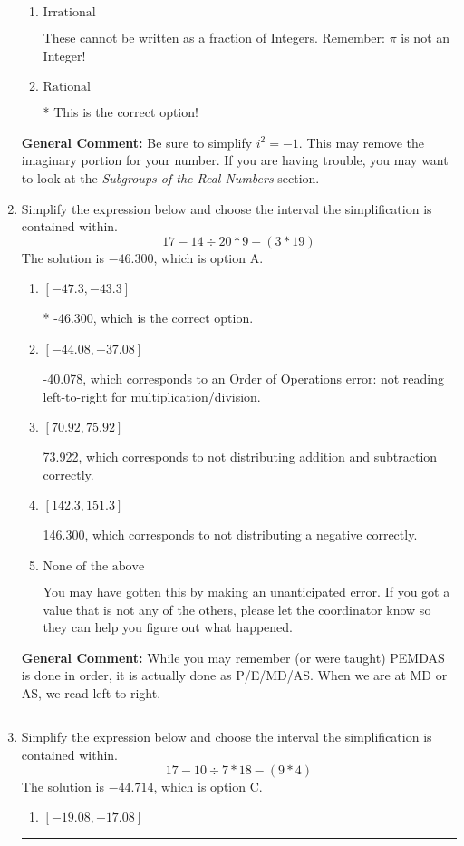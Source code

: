 \documentclass{extbook}[14pt]
\newcommand{\litem}[1]{\item #1

\rule{\textwidth}{0.4pt}}
\begin{document}
\begin{enumerate}
{\begin{enumerate}[label=\Alph*.]
This is a Complex number $(a+bi)$ that is not Real (has $i$ as part of the number).
\item \( \text{Irrational} \)

These cannot be written as a fraction of Integers. Remember: $\pi$ is not an Integer!
\item \( \text{Rational} \)

* This is the correct option!
\end{enumerate}

\textbf{General Comment:} Be sure to simplify $i^2 = -1$. This may remove the imaginary portion for your number. If you are having trouble, you may want to look at the \textit{Subgroups of the Real Numbers} section.
}
\litem{
Simplify the expression below and choose the interval the simplification is contained within.
\[ 17 - 14 \div 20 * 9 - (3 * 19) \]The solution is \( -46.300 \), which is option A.\begin{enumerate}[label=\Alph*.]
\item \( [-47.3, -43.3] \)

* -46.300, which is the correct option.
\item \( [-44.08, -37.08] \)

 -40.078, which corresponds to an Order of Operations error: not reading left-to-right for multiplication/division.
\item \( [70.92, 75.92] \)

 73.922, which corresponds to not distributing addition and subtraction correctly.
\item \( [142.3, 151.3] \)

 146.300, which corresponds to not distributing a negative correctly.
\item \( \text{None of the above} \)

 You may have gotten this by making an unanticipated error. If you got a value that is not any of the others, please let the coordinator know so they can help you figure out what happened.
\end{enumerate}

\textbf{General Comment:} While you may remember (or were taught) PEMDAS is done in order, it is actually done as P/E/MD/AS. When we are at MD or AS, we read left to right.
}
\litem{
Simplify the expression below and choose the interval the simplification is contained within.
\[ 17 - 10 \div 7 * 18 - (9 * 4) \]The solution is \( -44.714 \), which is option C.\begin{enumerate}[label=\Alph*.]
\item \( [-19.08, -17.08] \)


\end{enumerate}}
\end{enumerate}
\end{document}
